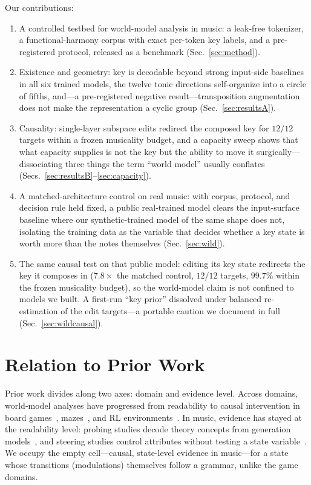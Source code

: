 \documentclass[conference]{IEEEtran}
\begin{document}
Our contributions:
\begin{enumerate}\itemsep1pt
\item A controlled testbed for world-model analysis in music: a leak-free
tokenizer, a functional-harmony corpus with exact per-token key labels, and a
pre-registered protocol, released as a benchmark (Sec.~\ref{sec:method}).
\item Existence and geometry: key is decodable beyond strong input-side
baselines in all six trained models, the twelve tonic directions self-organize
into a circle of fifths, and---a pre-registered negative result---transposition
augmentation does not make the representation a cyclic group
(Sec.~\ref{sec:resultsA}).
\item Causality: single-layer subspace edits redirect the composed key for
$12/12$ targets within a frozen musicality budget, and a capacity sweep shows
that what capacity supplies is not the key but the ability to move it
surgically---dissociating three things the term ``world model'' usually conflates
(Secs.~\ref{sec:resultsB}--\ref{sec:capacity}).
\item A matched-architecture control on real music: with corpus, protocol, and decision
rule held fixed, a public real-trained model clears the input-surface baseline where our
synthetic-trained model of the same shape does not, isolating the training data as the
variable that decides whether a key state is worth more than the notes themselves
(Sec.~\ref{sec:wild}).
\item The same causal test on that public model: editing its key state redirects the key
it composes in ($7.8\times$ the matched control, $12/12$ targets, $99.7\%$ within the
frozen musicality budget), so the world-model claim is not confined to models we built.
A first-run ``key prior'' dissolved under balanced re-estimation of the edit
targets---a portable caution we document in full (Sec.~\ref{sec:wildcausal}).
\end{enumerate}

\section{Relation to Prior Work}
\label{sec:prior}
Prior work divides along two axes: domain and evidence level. Across domains,
world-model analyses have progressed from readability to causal intervention in
board games~\cite{li2023othello,nanda2023emergent,mcgrath2022chess,karvonen2024chess},
mazes~\cite{maze2024}, and RL environments~\cite{iris2026}. In music, evidence has
stayed at the readability level: probing studies decode theory concepts from
generation models~\cite{syntheory2024}, and steering studies control attributes
without testing a state variable~\cite{smitin2024}. We occupy the empty
cell---causal, state-level evidence in music---for a state whose transitions
(modulations) themselves follow a grammar, unlike the game domains.
\end{document}
